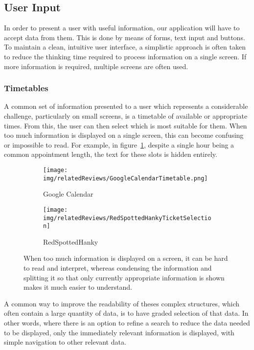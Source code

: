 \subsection{User Input}
\label{sub:user_input}

In order to present a user with useful information, our application will have
to accept data from them. This is done by means of forms, text input and
buttons. To maintain a clean, intuitive user interface, a simplistic approach
is often taken to reduce the thinking time required to process information on a
single screen. If more information is required, multiple screens are often
used.

\subsubsection{Timetables}
\label{ssub:timetables}

A common set of information presented to a user which represents a considerable
challenge, particularly on small screens, is a timetable of available or
appropriate times. From this, the user can then select which is most suitable
for them. When too much information is displayed on a single screen, this can
become confusing or impossible to read. For example, in
figure~\ref{fig:GoogleCalendarTimetable}\cite{GoogleCalendar}, despite a single
hour being a common appointment length, the text for these slots is hidden
entirely.
\begin{figure}[ht]
	\centering
	\begin{subfigure}[b]{0.25\textwidth}
		\texttt{[image: img/relatedReviews/GoogleCalendarTimetable.png]}
		\caption{Google Calendar}\label{fig:GoogleCalendarTimetable}
	\end{subfigure}%
	\qquad
	\begin{subfigure}[b]{0.25\textwidth}
		\texttt{[image: img/relatedReviews/RedSpottedHankyTicketSelection]}
		\caption{RedSpottedHanky}\label{fig:RedSpottedHankyTicketSelection}
	\end{subfigure}
	\caption{When too much information is displayed on a screen, it can be
		hard to read and interpret, whereas condensing the information and
		splitting it so that only currently appropriate information is shown
	makes it much easier to understand. }\label{fig:timetables}
\end{figure}

A common way to improve the readability of theses complex structures, which
often contain a large quantity of data, is to have graded selection of that
data. In other words, where there is an option to refine a search to reduce the
data needed to be displayed, only the  immediately relevant information is
displayed, with simple navigation to other relevant data.

